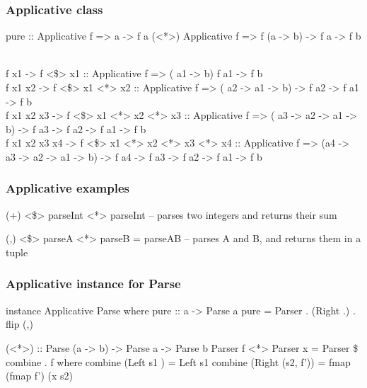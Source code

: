 \documentclass{beamer}
\begin{document}


\begin{frame}
\frametitle{Applicative class}
pure :: Applicative f => a -> f a
(<*>) Applicative f => f (a -> b) -> f a -> f b

\\f x1          -> f <\$> x1                      :: Applicative f => (                  a1 -> b)                            f a1 -> f b
\\f x1 x2       -> f <\$> x1 <*> x2               :: Applicative f => (            a2 -> a1 -> b)                 -> f a2 -> f a1 -> f b
\\f x1 x2 x3    -> f <\$> x1 <*> x2 <*> x3        :: Applicative f => (      a3 -> a2 -> a1 -> b)         -> f a3 -> f a2 -> f a1 -> f b
\\f x1 x2 x3 x4 -> f <\$> x1 <*> x2 <*> x3 <*> x4 :: Applicative f => (a4 -> a3 -> a2 -> a1 -> b) -> f a4 -> f a3 -> f a2 -> f a1 -> f b

\end{frame}


\begin{frame}
\frametitle{Applicative examples}
(+) <\$> parseInt <*> parseInt
-- parses two integers and returns their sum

(,) <\$> parseA <*> parseB = parseAB
-- parses A and B, and returns them in a tuple
\end{frame}


%
%
%


\begin{frame}
\frametitle{Applicative instance for Parse}
instance Applicative Parse where
  pure :: a -> Parse a
  pure = Parser . (Right .) . flip (,)

  (<*>) :: Parse (a -> b) -> Parse a -> Parse b
  Parser f <*> Parser x = Parser \$ combine . f
    where
      combine (Left   s1     ) = Left      s1
      combine (Right (s2, f')) = fmap (fmap f') (x s2)
\end{frame}
\end{document}

